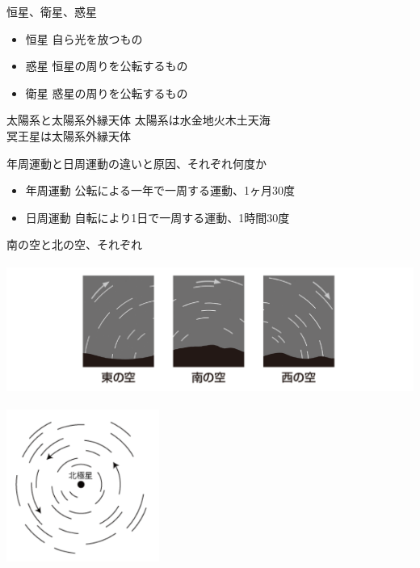 \documentclass[10pt,dvipdfmx]{jsarticle}
\newcommand{\answer}[2]{{\color{orange}#2}}
\newcommand{\answer}[2]{\vspace{#1mm}}
\begin{document}
\begin{itembox}[l]{恒星、衛星、惑星}
	\answer{15}{
		\begin{itemize}
			\item 恒星 自ら光を放つもの
			\item 惑星 恒星の周りを公転するもの
			\item 衛星 惑星の周りを公転するもの
		\end{itemize}
	}
\end{itembox}

\begin{itembox}[l]{太陽系と太陽系外縁天体}
	\answer{15}{太陽系は水金地火木土天海\\
		冥王星は太陽系外縁天体}
\end{itembox}

\begin{itembox}[l]{年周運動と日周運動の違いと原因、それぞれ何度か}
	\answer{20}{
		\begin{itemize}
			\item 年周運動 公転による一年で一周する運動、1ヶ月30度
			\item 日周運動 自転により1日で一周する運動、1時間30度
		\end{itemize}
	}
\end{itembox}

\begin{itembox}[l]{南の空と北の空、それぞれ}
	\answer{70}{
		\includegraphics[height=5cm]{science_figure/seiza_minami.pdf}
		\includegraphics[height=5cm]{science_figure/seiza_kita.pdf}
	}
\end{itembox}
\end{document}
